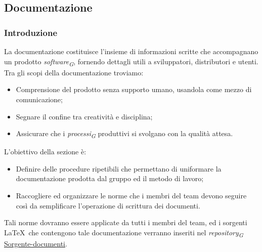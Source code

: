 \subsection{Documentazione}

\subsubsection{Introduzione}
La documentazione costituisce l'insieme di informazioni scritte che accompagnano un prodotto \textit{software}\textsubscript{\textit{G}}, fornendo dettagli utili a sviluppatori, distributori e utenti.\\
Tra gli scopi della documentazione troviamo:
\begin{itemize}
    \item Comprensione del prodotto senza supporto umano, usandola come mezzo di comunicazione;
    \item Segnare il confine tra creatività e disciplina;
    \item Assicurare che i \textit{processi}\textsubscript{\textit{G}} produttivi si svolgano con la qualità attesa.
\end{itemize}

L'obiettivo della sezione è:
\begin{itemize}
    \item  Definire delle procedure ripetibili che permettano di uniformare la documentazione prodotta dal gruppo ed il metodo di lavoro;
    \item  Raccogliere ed organizzare le norme che i membri del team devono seguire così da semplificare l'operazione di scrittura dei documenti.
\end{itemize}
Tali norme dovranno essere applicate da tutti i membri del team, ed i sorgenti \LaTeX\ che contengono tale documentazione verranno inseriti nel \textit{repository}\textsubscript{\textit{G}} \href{https://github.com/ByteOps-swe/Sorgente-documenti}{Sorgente-documenti}.

\begin{comment} \paragraph*{Primi approcci alla redazione di documenti e problematiche riscontrate}
Per la composizione iniziale dei documenti richiesti per la candidatura, è stato sperimentato un'approccio che impiegava gli strumenti di Google Drive. Tale metodologia consentiva ai redattori di redigere agevolmente i documenti senza la necessità di padroneggiare la sintassi LaTeX, con l'intenzione di trasporre successivamente il contenuto in LaTeX una volta che fosse stato validato dai verificatori. Tuttavia, questo approccio ha suscitato problematiche, tra cui:
\begin{itemize}
    \item Rischio di incoerenza tra il contenuto presente negli strumenti di Google Drive.
    \item Prolungato impiego di tempo per la riscrittura in LaTeX, dovuto alla necessità di un passaggio aggiuntivo.
\end{itemize}
Per tali ragioni si è presa la decisione di adottare un nuovo approccio.
\end{comment}
